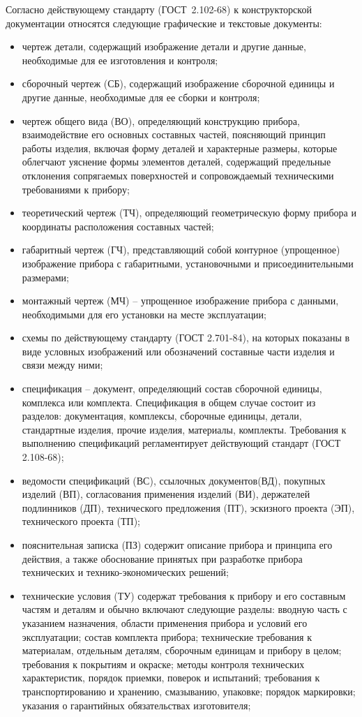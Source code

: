 Согласно действующему стандарту (ГОСТ~2.102-68) к конструкторской документации относятся следующие графические и текстовые документы:
\begin{itemize}
	\item чертеж детали, содержащий изображение детали и другие данные, необходимые для ее изготовления и контроля;
	\item сборочный чертеж (СБ), содержащий изображение сборочной единицы и другие данные, необходимые для ее сборки и контроля;
	\item чертеж общего вида (ВО), определяющий конструкцию прибора, взаимодействие его основных составных частей, поясняющий принцип работы изделия, включая форму деталей и характерные размеры, которые облегчают уяснение формы элементов деталей, содержащий предельные отклонения сопрягаемых поверхностей и сопровождаемый техническими требованиями к прибору;
	\item теоретический чертеж (ТЧ), определяющий геометрическую форму прибора и координаты расположения составных частей;
	\item габаритный чертеж (ГЧ), представляющий собой контурное (упрощенное) изображение прибора с габаритными, установочными и присоединительными размерами;
	\item монтажный чертеж (МЧ) -- упрощенное изображение прибора с данными, необходимыми для его установки на месте эксплуатации;
	\item схемы по действующему стандарту (ГОСТ 2.701-84), на которых показаны в виде условных изображений или обозначений составные части изделия и связи между ними;
	\item спецификация -- документ, определяющий состав сборочной единицы, комплекса или комплекта. Спецификация в общем случае состоит из разделов: документация, комплексы, сборочные единицы, детали, стандартные изделия, прочие изделия, материалы, комплекты. Требования к выполнению спецификаций регламентирует действующий стандарт (ГОСТ 2.108-68);
	\item ведомости спецификаций (ВС), ссылочных документов(ВД), покупных изделий (ВП), согласования применения изделий (ВИ), держателей подлинников (ДП), технического предложения (ПТ), эскизного проекта (ЭП), технического проекта (ТП);
	\item пояснительная записка (ПЗ) содержит описание прибора и принципа его действия, а также обоснование принятых при разработке прибора технических и технико-экономических решений;
	\item технические условия (ТУ) содержат требования к прибору и его составным частям и деталям и обычно включают следующие разделы: вводную часть с указанием назначения, области применения прибора и условий его эксплуатации; состав комплекта прибора; технические требования к материалам, отдельным деталям, сборочным единицам и прибору в целом; требования к покрытиям и окраске; методы контроля технических характеристик, порядок приемки, поверок и испытаний; требования к транспортированию и хранению, смазыванию, упаковке; порядок маркировки; указания о гарантийных обязательствах изготовителя;

\end{itemize}
